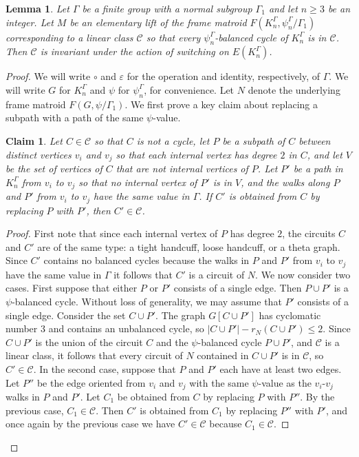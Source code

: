 \documentclass[12pt]{article}
\newtheorem{claim}{Claim}[theorem]
\newtheorem{lemma}[theorem]{Lemma}
\theoremstyle{definition}
\newcommand{\cC}{\mathcal{C}}
\newcommand{\ep}{\varepsilon}
\begin{document}
\begin{lemma} \label{lem: switching action}
Let $\Gamma$ be a finite group with a normal subgroup $\Gamma_1$ and let $n \ge 3$ be an integer.
Let $M$ be an elementary lift of the frame matroid $F(K_n^{\Gamma}, \psi_n^{\Gamma}/\Gamma_1)$ corresponding to a linear class $\cC$ so that every $\psi_n^{\Gamma}$-balanced cycle of $K_n^{\Gamma}$ is in $\cC$.
Then $\cC$ is invariant under the action of switching on $E(K_n^{\Gamma})$.
\end{lemma}
\begin{proof}
We will write $\circ$ and $\ep$ for the operation and identity, respectively, of $\Gamma$.
We will write $G$ for $K_n^{\Gamma}$ and $\psi$ for $\psi_n^{\Gamma}$, for convenience.
Let $N$ denote the underlying frame matroid $F(G, \psi/\Gamma_1)$.
We first prove a key claim about replacing a subpath with a path of the same $\psi$-value.

\begin{claim} \label{claim: replace a path}
Let $C \in \cC$ so that $C$ is not a cycle, let $P$ be a subpath of $C$ between distinct vertices $v_i$ and $v_j$ so that each internal vertex has degree $2$ in $C$, and let $V$ be the set of vertices of $C$ that are not internal vertices of $P$.
Let $P'$ be a path in $K_n^{\Gamma}$ from $v_i$ to $v_j$ so that no internal vertex of $P'$ is in $V$, and the walks along $P$ and $P'$ from $v_i$ to $v_j$ have the same value in $\Gamma$. 
If $C'$ is obtained from $C$ by replacing $P$ with $P'$, then $C' \in \cC$.
\end{claim}
\begin{proof}
First note that since each internal vertex of $P$ has degree $2$, the circuits $C$ and $C'$ are of the same type: a tight handcuff, loose handcuff, or a theta graph.
Since $C'$ contains no balanced cycles because the walks in $P$ and $P'$ from $v_i$ to $v_j$ have the same value in $\Gamma$ it follows that $C'$ is a circuit of $N$.
We now consider two cases.
First suppose that either $P$ or $P'$ consists of a single edge.
Then $P \cup P'$ is a $\psi$-balanced cycle.
Without loss of generality, we may assume that $P'$ consists of a single edge.
Consider the set $C \cup P'$.
The graph $G[C \cup P']$ has cyclomatic number $3$ and contains an unbalanced cycle, so $|C \cup P'| - r_N(C \cup P') \le 2$.
Since $C \cup P'$ is the union of the circuit $C$ and the $\psi$-balanced cycle $P \cup P'$, and $\cC$ is a linear class, it follows that every circuit of $N$ contained in $C \cup P'$ is in $\cC$, so $C' \in \cC$.
In the second case, suppose that $P$ and $P'$ each have at least two edges.
Let $P''$ be the edge oriented from $v_i$ and $v_j$ with the same $\psi$-value as the $v_i$-$v_j$ walks in $P$ and $P'$.
Let $C_1$ be obtained from $C$ by replacing $P$ with $P''$.
By the previous case, $C_1 \in \cC$.
Then $C'$ is obtained from $C_1$ by replacing $P''$ with $P'$, and once again by the previous case we have $C' \in \cC$ because $C_1 \in \cC$.
\end{proof}



\end{proof}
\end{document}
